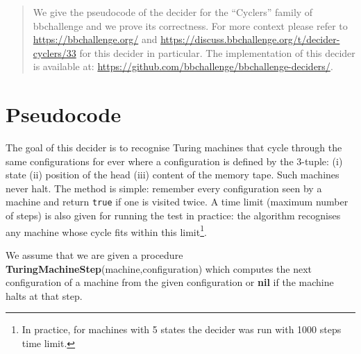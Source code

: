 \documentclass[a4paper,british]{article}
\begin{document}
\date{}
\maketitle

\begin{abstract}
        We give the pseudocode of the decider for the ``Cyclers'' family of bbchallenge and we prove its correctness. For more context please refer to \url{https://bbchallenge.org/} and \url{https://discuss.bbchallenge.org/t/decider-cyclers/33} for this decider in particular. The implementation of this decider is available at: \url{https://github.com/bbchallenge/bbchallenge-deciders/}.
\end{abstract}

\section{Pseudocode}

The goal of this decider is to recognise Turing machines that cycle through the same configurations for ever where a configuration is defined by the 3-tuple: (i) state (ii) position of the head (iii) content of the memory tape. Such machines never halt. The method is simple: remember every configuration seen by a machine and return \texttt{true} if one is visited twice. A time limit (maximum number of steps) is also given for running the test in practice: the algorithm recognises any machine whose cycle fits within this limit\footnote{In practice, for machines with 5 states the decider was run with 1000 steps time limit.}.

We assume that we are given a procedure \textbf{TuringMachineStep}(machine,configuration) which computes the next configuration of a machine from the given configuration or \textbf{nil} if the machine halts at that step.
\end{document}
